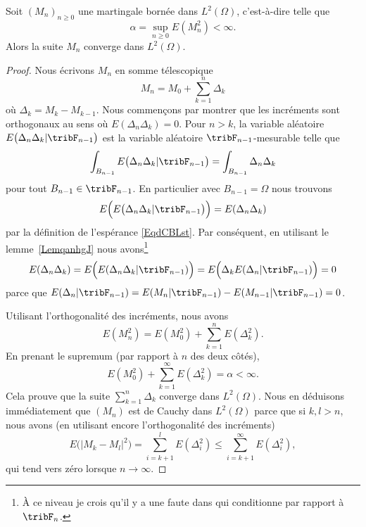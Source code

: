\begin{theorem}     \label{ThobysyWI}
	Soit \( (M_n)_{n\geq 0}\) une martingale bornée dans \( L^2(\Omega)\), c'est-à-dire telle que
	\begin{equation}
		\alpha=\sup_{n\geq 0}E(M_n^2)<\infty.
	\end{equation}
	Alors la suite \( M_n\) converge dans \( L^2(\Omega)\).
\end{theorem}

\begin{proof}
	Nous écrivons \( M_n\) en somme télescopique
	\begin{equation}
		M_n=M_0+\sum_{k=1}^n\Delta_k
	\end{equation}
	où \( \Delta_k=M_k-M_{k-1}\). Nous commençons par montrer que les incréments sont orthogonaux au sens où \( E(\Delta_n\Delta_k)=0\). Pour \( n>k\), la variable aléatoire \( E\big( \Delta_n\Delta_k|\tribF_{n-1} \big)\) est la variable aléatoire \( \tribF_{n-1}\)-mesurable telle que
	\begin{equation}
		\int_{B_{n-1}}E\big( \Delta_n\Delta_k|\tribF_{n-1} \big)=\int_{B_{n-1}}\Delta_n\Delta_k
	\end{equation}
	pour tout \( B_{n-1}\in\tribF_{n-1}\). En particulier avec \( B_{n-1}=\Omega\) nous trouvons
	\begin{equation}
		E\Big( E\big( \Delta_n\Delta_k|\tribF_{n-1} \big)\Big)=E(\Delta_n\Delta_k)
	\end{equation}
	par la définition de l'espérance \eqref{EqdCBLst}. Par conséquent, en utilisant le lemme~\ref{LemqanhgJ} nous avons\footnote{À ce niveau je crois qu'il y a une faute dans \cite{PMCmartinLP} qui conditionne par rapport à \( \tribF_n\).}
	\begin{equation}
		E(\Delta_n\Delta_k)=E\Big( E(\Delta_n\Delta_k|\tribF_{n-1}) \Big)=E\Big( \Delta_kE(\Delta_n|\tribF_{n-1}) \Big)=0
	\end{equation}
	parce que \( E(\Delta_n|\tribF_{n-1})=E(M_n|\tribF_{n-1})-E(M_{n-1}|\tribF_{n-1})=0\).

	Utilisant l'orthogonalité des incréments, nous avons
	\begin{equation}
		E(M_n^2)=E(M_0^2)+\sum_{k=1}^nE(\Delta_k^2).
	\end{equation}
	En prenant le supremum (par rapport à \( n\) des deux côtés),
	\begin{equation}
		E(M_0^2)+\sum_{k=1}^{\infty}E(\Delta_k^2)=\alpha<\infty.
	\end{equation}
	Cela prouve que la suite \( \sum_{k=1}^n\Delta_k\) converge dans \( L^2(\Omega)\). Nous en déduisons immédiatement que \( (M_n)\) est de Cauchy dans \( L^2(\Omega)\) parce que si \( k,l>n\), nous avons (en utilisant encore l'orthogonalité des incréments)
	\begin{equation}
		E\big( | M_k-M_l |^2 \big)=\sum_{i=k+1}^lE(\Delta_i^2)\leq\sum_{i=k+1}^{\infty}E(\Delta_i^2),
	\end{equation}
	qui tend vers zéro lorsque \( n\to\infty\).
\end{proof}

